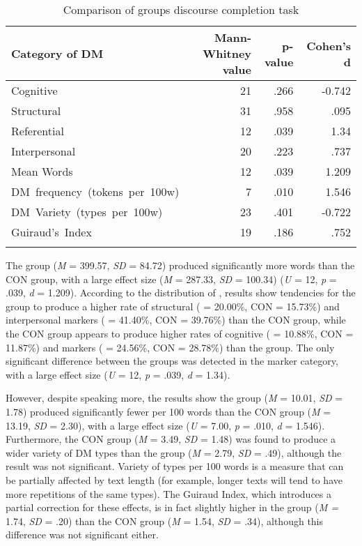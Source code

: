 \documentclass[output=paper]{langsci/langscibook}
\begin{document}
\begin{table}[t]
\caption{\label{tab:ament:10} Comparison of groups discourse completion task }
\begin{tabularx}{\textwidth}{Qrrr}
\lsptoprule
\bfseries Category of DM & \bfseries {Mann-Whitney value} & \bfseries {p-value}  & \bfseries {Cohen’s d} \\
\midrule 
{Cognitive} &  21 &  .266 & { -0.742}\\
{Structural} &  31 &  .958 & {} .095\\
{Referential} &  12 &  .039 & {} 1.34\\
{Interpersonal} &  20 &  .223 & {} .737\\
{Mean Words}  &  12 &  .039 & {} 1.209\\
\mbox{{DM frequency (tokens per 100w)}}   &  7 &  .010 & {} 1.546\\
\mbox{{DM Variety  (types per 100w)}   }&  23 &  .401 & {-0.722} \\
\mbox{Guiraud’s Index} &  19 &  .186 & {} .752\\
\lspbottomrule
\end{tabularx}
\end{table}

The  group (\textit{M} = 399.57, \textit{SD} = 84.72) produced significantly more words than the CON group, with a large effect size (\textit{M} = 287.33, \textit{SD} = 100.34) (\textit{U} = 12, \textit{p} = .039, \textit{d} = 1.209). According to the distribution of , results show tendencies for the  group to produce a higher rate of structural ( = 20.00\%, CON = 15.73\%) and interpersonal markers ( = 41.40\%, CON = 39.76\%) than the CON group, while the CON group appears to produce higher rates of cognitive ( = 10.88\%, CON = 11.87\%) and  markers ( = 24.56\%, CON = 28.78\%) than the  group. The only significant difference between the groups was detected in the  marker category, with a large effect size (\textit{U} = 12, \textit{p} = .039, \textit{d} = 1.34). 

However, despite speaking more, the results show the  group (\textit{M} = 10.01, \textit{SD} = 1.78) produced significantly fewer  per 100 words than the CON group (\textit{M} = 13.19, \textit{SD} = 2.30), with a large effect size (\textit{U} = 7.00, \textit{p} = .010, \textit{d} = 1.546). Furthermore, the CON group (\textit{M} = 3.49, \textit{SD} = 1.48) was found to produce a wider variety of DM types than the  group (\textit{M} = 2.79, \textit{SD} = .49), although the result was not significant. Variety of types per 100 words is a measure that can be partially affected by text length (for example, longer texts will tend to have more repetitions of the same types). The Guiraud Index, which introduces a partial correction for these effects, is in fact slightly higher in the  group (\textit{M =} 1.74, \textit{SD} = .20) than the CON group (\textit{M} = 1.54, \textit{SD} = .34), although this difference was not significant either. 
\end{document}
